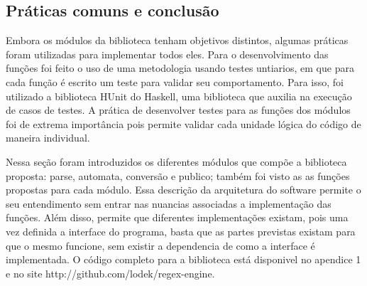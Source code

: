 \subsection{Práticas comuns e conclusão}
Embora os módulos da biblioteca tenham objetivos distintos, algumas práticas foram utilizadas para implementar todos eles.
Para o desenvolvimento das funções foi feito o uso de uma metodologia usando testes untiarios, em que para cada função é escrito um teste para validar seu comportamento.
Para isso, foi utilizado a biblioteca HUnit do Haskell, uma biblioteca que auxilia na execução de casos de testes.
A prática de desenvolver testes para as funções dos módulos foi de extrema importância pois permite validar cada unidade lógica do código de maneira individual.

Nessa seção foram introduzidos os diferentes módulos que compõe a biblioteca proposta: parse, automata, conversão e publico; também foi visto as as funções propostas para cada módulo.
Essa descrição da arquitetura do software permite o seu entendimento sem entrar nas nuancias associadas a implementação das funções.
Além disso, permite que diferentes implementações existam, pois uma vez definida a interface do programa, basta que as partes previstas existam para que o mesmo funcione, sem existir a dependencia de como a interface é implementada.
O código completo para a biblioteca está disponivel no apendice 1 e no site http://github.com/lodek/regex-engine.
